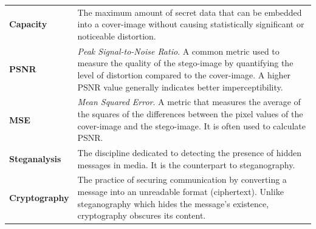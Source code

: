 \begin{longtable}{p{3.5cm} p{10.5cm}}
	\textbf{Capacity} & The maximum amount of secret data that can be embedded into a cover-image without causing statistically significant or noticeable distortion. \\
	\textbf{PSNR} & \textit{Peak Signal-to-Noise Ratio}. A common metric used to measure the quality of the stego-image by quantifying the level of distortion compared to the cover-image. A higher PSNR value generally indicates better imperceptibility. \\
	\textbf{MSE} & \textit{Mean Squared Error}. A metric that measures the average of the squares of the differences between the pixel values of the cover-image and the stego-image. It is often used to calculate PSNR. \\
	\textbf{Steganalysis} & The discipline dedicated to detecting the presence of hidden messages in media. It is the counterpart to steganography. \\
	\textbf{Cryptography} & The practice of securing communication by converting a message into an unreadable format (ciphertext). Unlike steganography which hides the message's existence, cryptography obscures its content. \\
\end{longtable}



